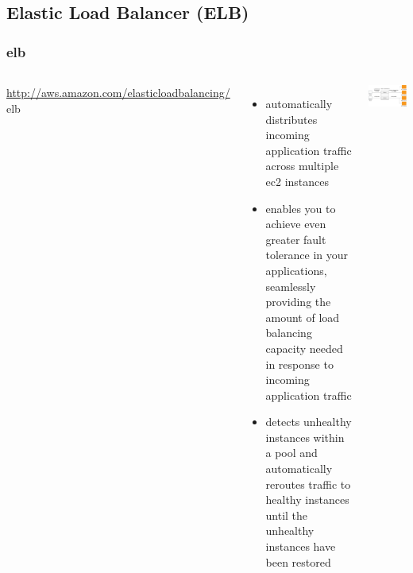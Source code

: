 \documentclass{beamer}
\begin{document}
\subsection{Elastic Load Balancer (ELB)}
\begin{frame}
\frametitle[\gls{elb}]{\acrfull{elb}}

\begin{columns}
\url{http://aws.amazon.com/elasticloadbalancing/}
\gls{elb}
\begin{itemize}
  \item automatically distributes incoming application traffic across multiple \gls{ec2} instances
  \item enables you to achieve even greater fault tolerance in your applications, seamlessly providing the amount of load balancing capacity needed in response to incoming application traffic
  \item detects unhealthy instances within a pool and automatically reroutes traffic to healthy instances until the unhealthy instances have been restored
\end{itemize}
\includegraphics[width=1.0 \textwidth]{elb-listeners.png}
\end{columns}

\end{frame}
\end{document}
